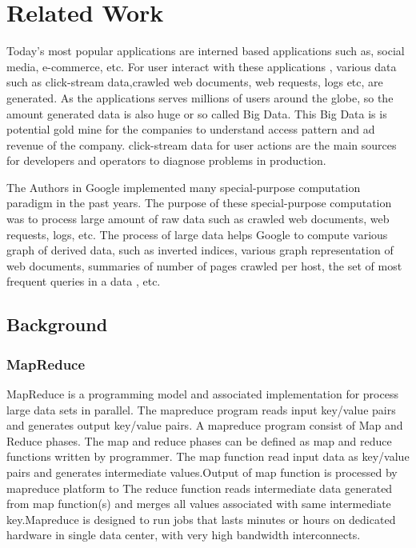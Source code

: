 
\chapter{Related Work} %

\label{Chapter2} %




Today's most popular applications are interned based applications such as, social media, e-commerce, etc. For user interact with these applications , various data such as  click-stream data,crawled web documents, web requests, logs etc, are generated. As the applications serves millions of users around the globe, so the amount generated data is also huge or so called Big Data. This Big Data is is potential gold mine for the companies to understand access pattern and ad revenue of the company.  click-stream data for user actions are the main sources for developers and operators to diagnose problems in production.\cite{mat1}

    The Authors in Google implemented many special-purpose computation paradigm in the past years. The purpose of these special-purpose computation was to process large amount of raw data such as crawled web documents, web requests, logs, etc. The process of large data helps Google to compute various graph of derived data, such as inverted indices, various graph representation of web documents, summaries of number of pages crawled per host, the set of most frequent queries in a data , etc.\cite{google}

\section{Background}

\subsection{MapReduce}

MapReduce is a programming model and associated implementation for process large data sets in parallel. The mapreduce program reads input key/value pairs and generates output key/value pairs. A mapreduce program consist of Map and Reduce phases. The map and reduce phases can be defined as map and reduce functions written by programmer. The map function read input data as  key/value pairs and generates intermediate values.Output of map function is processed by mapreduce platform to  The reduce function reads intermediate data generated from map function(s) and merges all values associated with same intermediate key.Mapreduce is designed to run jobs that lasts minutes or hours on dedicated hardware in single data center, with very high bandwidth interconnects.\cite{tom3}



